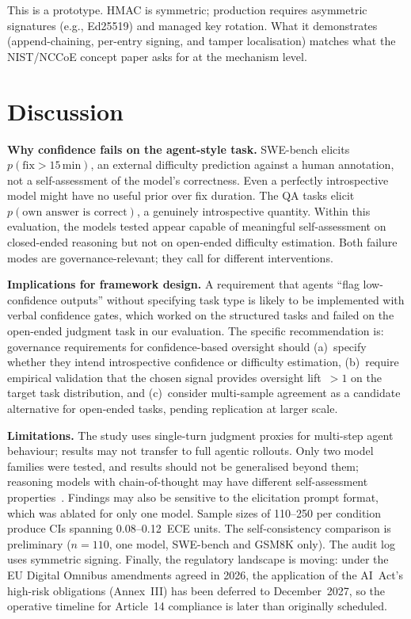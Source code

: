 \documentclass[10pt,twocolumn]{article}
\begin{document}
This is a prototype. HMAC is symmetric; production requires asymmetric
signatures (e.g., Ed25519) and managed key rotation. What it demonstrates
(append-chaining, per-entry signing, and tamper localisation) matches what the
NIST/NCCoE concept paper asks for at the mechanism level.

\section{Discussion}

\textbf{Why confidence fails on the agent-style task.}
SWE-bench elicits $p(\text{fix}{>}15\,\text{min})$, an external difficulty
prediction against a human annotation, not a self-assessment of the model's
correctness. Even a perfectly introspective model might have no useful prior over
fix duration. The QA tasks elicit $p(\text{own answer is correct})$, a
genuinely introspective quantity. Within this evaluation, the models tested
appear capable of meaningful self-assessment on closed-ended reasoning but not
on open-ended difficulty estimation. Both failure modes are
governance-relevant; they call for different interventions.

\textbf{Implications for framework design.}
A requirement that agents ``flag low-confidence outputs'' without specifying task
type is likely to be implemented with verbal confidence gates, which worked on
the structured tasks and failed on the open-ended judgment task in our
evaluation. The specific recommendation is:
governance requirements for confidence-based oversight should (a)~specify whether
they intend introspective confidence or difficulty estimation, (b)~require
empirical validation that the chosen signal provides oversight lift~$>1$ on the
target task distribution, and (c)~consider multi-sample agreement as a candidate
alternative for open-ended tasks, pending replication at larger scale.

\textbf{Limitations.}
The study uses single-turn judgment proxies for multi-step agent behaviour;
results may not transfer to full agentic rollouts. Only two model families were
tested, and results should not be generalised beyond them; reasoning models with
chain-of-thought may have different self-assessment
properties~\citep{kadavath2022}. Findings may also be sensitive to the
elicitation prompt format, which was ablated for only one model. Sample sizes
of 110--250 per condition produce CIs spanning 0.08--0.12~ECE units. The
self-consistency comparison is preliminary ($n{=}110$, one model, SWE-bench and
GSM8K only). The audit log uses symmetric signing. Finally, the regulatory
landscape is moving: under the EU Digital Omnibus amendments agreed in 2026,
the application of the AI~Act's high-risk obligations (Annex~III) has been
deferred to December~2027, so the operative timeline for Article~14 compliance
is later than originally scheduled.
\end{document}
